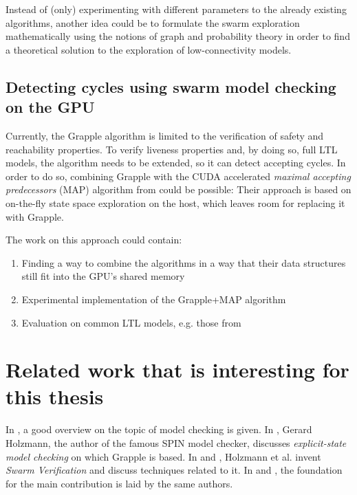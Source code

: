 \documentclass[a4paper]{scrartcl}
\begin{document}
Instead of (only) experimenting with different parameters to the already existing algorithms, another idea could be to formulate the swarm exploration mathematically using the notions of graph and probability theory in order to find a theoretical solution to the exploration of low-connectivity models.


\subsection{Detecting cycles using swarm model checking on the GPU}

Currently, the Grapple algorithm is limited to the verification of safety and reachability properties.
To verify liveness properties and, by doing so, full LTL models, the algorithm needs to be extended, so it can detect accepting cycles.
In order to do so, combining Grapple with the CUDA accelerated \emph{maximal accepting predecessors} (MAP) algorithm from \cite{Barnat2009.MAP} could be possible:
Their approach is based on on-the-fly state space exploration on the host, which leaves room for replacing it with Grapple.

The work on this approach could contain:

\begin{enumerate}
    \item Finding a way to combine the algorithms in a way that their data structures still fit into the GPU's shared memory
    \item Experimental implementation of the Grapple+MAP algorithm
    \item Evaluation on common LTL models, e.g. those from \cite{Barnat2009.MAP}
\end{enumerate}


\section{Related work that is interesting for this thesis}

In \cite{Clarke2018.Introduction-to-Model-Checking}, a good overview on the topic of model checking is given.
In \cite{Holzmann2018.Explicit-State-Model-Checking}, Gerard Holzmann, the author of the famous SPIN model checker, discusses \emph{explicit-state model checking} on which Grapple is based.
In \cite{Holzmann2008.Swarm-Verification} and \cite{Holzmann2011.Swarm-Verification-Techniques}, Holzmann et al. invent \emph{Swarm Verification} and discuss techniques related to it.
In \cite{Cho2018.FPGASwarm} and \cite{Bartocci2014.GPGPU-Parallel-SPIN}, the foundation for the main contribution \cite{DeFrancisco2020.Grapple} is laid by the same authors.
\end{document}
